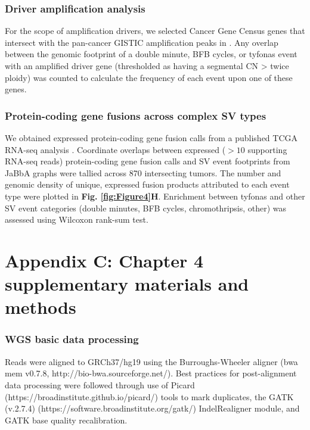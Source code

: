 \documentclass[phd,tocprelim]{cornell}
\begin{document}
\subsection*{Driver amplification analysis}

For the scope of amplification drivers, we selected Cancer Gene Census genes that intersect with the pan-cancer GISTIC amplification peaks in \cite{Zack:2013f1f}. Any overlap between the genomic footprint of a double minute, BFB cycles, or tyfonas event with an amplified driver gene (thresholded as having a segmental CN > twice ploidy) was counted to calculate the frequency of each event upon one of these genes.

\subsection*{Protein-coding gene fusions across complex SV types}
We obtained expressed protein-coding gene fusion calls from a published TCGA RNA-seq analysis \cite{Dehghannasiri2019-hk}.  Coordinate overlaps between expressed ($>10$ supporting RNA-seq reads) protein-coding gene fusion calls and SV event footprints from JaBbA graphs were tallied across 870 intersecting tumors. The number and genomic density of unique, expressed fusion products attributed to each event type were plotted in \textbf{Fig. \ref{fig:Figure4}H}.  Enrichment between tyfonas and other SV event categories (double minutes, BFB cycles, chromothripsis, other) was assessed using Wilcoxon rank-sum test.


\chapter*{Appendix C: Chapter 4 supplementary materials and methods} \label{app:c}
\subsection*{WGS basic data processing} \label{app:tc_wgs_processing}
Reads were aligned to GRCh37/hg19 using the Burroughs-Wheeler aligner (bwa mem v0.7.8, http://bio-bwa.sourceforge.net/). Best practices for post-alignment data processing were followed through use of Picard (https://broadinstitute.github.io/picard/) tools to mark duplicates, the GATK (v.2.7.4) (https://software.broadinstitute.org/gatk/) IndelRealigner module, and GATK base quality recalibration.
\end{document}
